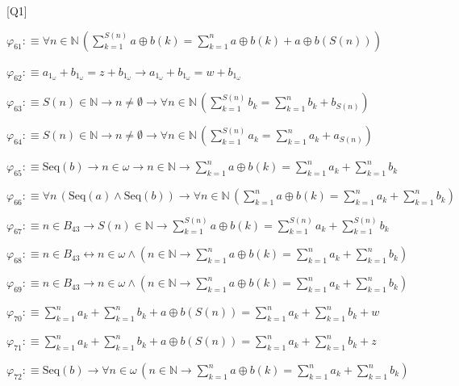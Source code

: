 \begin{fullproof}{[Q1]}
\begin{abbrevlist}
\item $\varphi_{61} :\equiv \forall n \in \mathbb{N}\,({\textstyle\sum_{k=1}^{S(n)} a \oplus b(k)} = {\textstyle\sum_{k=1}^{n} a \oplus b(k)} + a \oplus b(S(n)))$
\item $\varphi_{62} :\equiv a_{1_{\omega}} + b_{1_{\omega}} = z + b_{1_{\omega}} \to a_{1_{\omega}} + b_{1_{\omega}} = w + b_{1_{\omega}}$
\item $\varphi_{63} :\equiv S(n) \in \mathbb{N} \to n \neq \emptyset \to \forall n \in \mathbb{N}\,({\textstyle\sum_{k=1}^{S(n)} b_{k}} = {\textstyle\sum_{k=1}^{n} b_{k}} + b_{S(n)})$
\item $\varphi_{64} :\equiv S(n) \in \mathbb{N} \to n \neq \emptyset \to \forall n \in \mathbb{N}\,({\textstyle\sum_{k=1}^{S(n)} a_{k}} = {\textstyle\sum_{k=1}^{n} a_{k}} + a_{S(n)})$
\item $\varphi_{65} :\equiv \mathrm{Seq}(b) \to n \in \omega \to n \in \mathbb{N} \to {\textstyle\sum_{k=1}^{n} a \oplus b(k)} = {\textstyle\sum_{k=1}^{n} a_{k}} + {\textstyle\sum_{k=1}^{n} b_{k}}$
\item $\varphi_{66} :\equiv \forall n\,(\mathrm{Seq}(a) \land \mathrm{Seq}(b)) \to \forall n \in \mathbb{N}\,({\textstyle\sum_{k=1}^{n} a \oplus b(k)} = {\textstyle\sum_{k=1}^{n} a_{k}} + {\textstyle\sum_{k=1}^{n} b_{k}})$
\item $\varphi_{67} :\equiv n \in B_{43} \to S(n) \in \mathbb{N} \to {\textstyle\sum_{k=1}^{S(n)} a \oplus b(k)} = {\textstyle\sum_{k=1}^{S(n)} a_{k}} + {\textstyle\sum_{k=1}^{S(n)} b_{k}}$
\item $\varphi_{68} :\equiv n \in B_{43} \leftrightarrow n \in \omega \land (n \in \mathbb{N} \to {\textstyle\sum_{k=1}^{n} a \oplus b(k)} = {\textstyle\sum_{k=1}^{n} a_{k}} + {\textstyle\sum_{k=1}^{n} b_{k}})$
\item $\varphi_{69} :\equiv n \in B_{43} \to n \in \omega \land (n \in \mathbb{N} \to {\textstyle\sum_{k=1}^{n} a \oplus b(k)} = {\textstyle\sum_{k=1}^{n} a_{k}} + {\textstyle\sum_{k=1}^{n} b_{k}})$
\item $\varphi_{70} :\equiv {\textstyle\sum_{k=1}^{n} a_{k}} + {\textstyle\sum_{k=1}^{n} b_{k}} + a \oplus b(S(n)) = {\textstyle\sum_{k=1}^{n} a_{k}} + {\textstyle\sum_{k=1}^{n} b_{k}} + w$
\item $\varphi_{71} :\equiv {\textstyle\sum_{k=1}^{n} a_{k}} + {\textstyle\sum_{k=1}^{n} b_{k}} + a \oplus b(S(n)) = {\textstyle\sum_{k=1}^{n} a_{k}} + {\textstyle\sum_{k=1}^{n} b_{k}} + z$
\item $\varphi_{72} :\equiv \mathrm{Seq}(b) \to \forall n \in \omega\,(n \in \mathbb{N} \to {\textstyle\sum_{k=1}^{n} a \oplus b(k)} = {\textstyle\sum_{k=1}^{n} a_{k}} + {\textstyle\sum_{k=1}^{n} b_{k}})$

\end{abbrevlist}
\end{fullproof}
